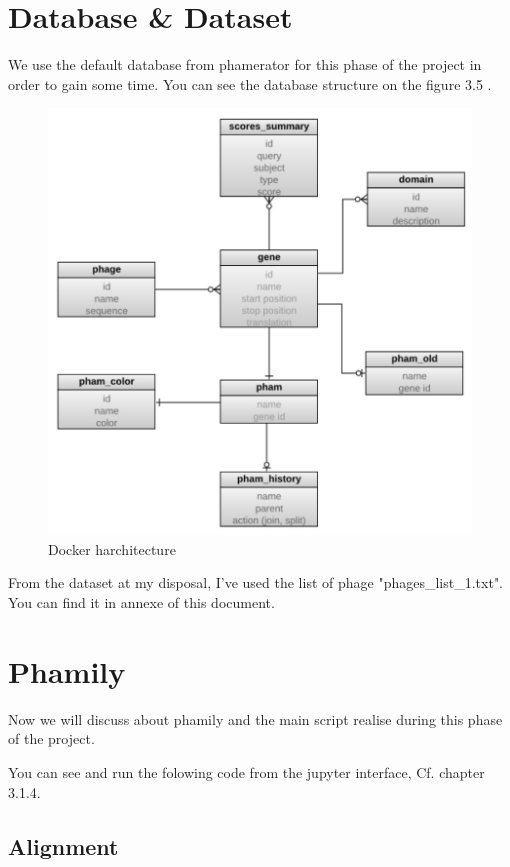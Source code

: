 \documentclass[a4paper,11pt]{report}
\begin{document}
\section{Database \& Dataset}
We use the default database from phamerator for this phase of the project in order to gain some time. You can see the database structure on the figure 3.5 .

\begin{figure}[H] 
	\begin{center}
		\includegraphics[scale=0.6]{img/12859_2011_Article_4954_Fig1_HTML}
		\caption{Docker harchitecture}
	\end{center}
\end{figure}

From the dataset at my disposal, I've used the list of phage "phages\_list\_1.txt". You can find it in annexe of this document.

\section{Phamily}
Now we will discuss about phamily and the main script realise during this phase of the project.

You can see and run the folowing code from the jupyter interface, Cf. chapter 3.1.4.

\subsection{Alignment}
\end{document}
